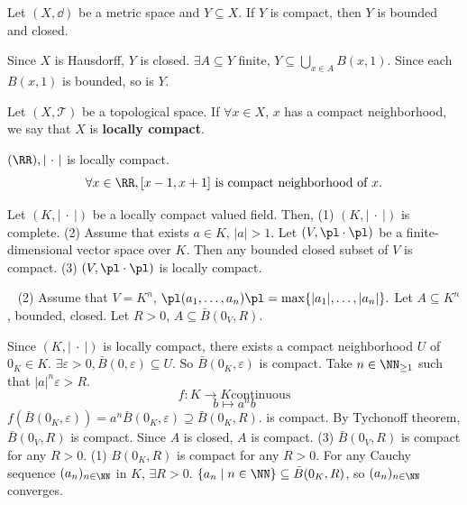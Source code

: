\begin{propositionenv}
    Let $(X,\dd)$ be a metric space and $Y\subseteq X$. If $Y$ is compact, then $Y$ is bounded and closed.
\end{propositionenv}
\begin{proofenv}
    Since $X$ is Hausdorff, $Y$ is closed. $\exists A\subseteq Y$ finite, $Y\subseteq \bigcup_{x\in A}B(x,1)$. Since each $B(x,1)$ is bounded, so is $Y$.
\end{proofenv}
\begin{definitionenv}
    Let $(X,\mathscr{T})$ be a topological space. If $\forall x\in X$, $x$ has a compact neighborhood, we say that $X$ is \textbf{locally compact}.
\end{definitionenv}
\begin{exampleenv}
    $(\RR),\left|\ \cdot\ \right|$ is locally compact. 
    $$\forall x\in \RR, [x-1,x+1] \text{ is compact neighborhood of } x.$$
\end{exampleenv}
\begin{propositionenv}
    Let $(K,\left|\ \cdot\ \right|)$ be a locally compact valued field. Then,
    \newline
    (1) $(K,\left|\ \cdot\ \right|)$ is complete.
    \newline
    (2) Assume that exists $a\in K$, $|a|>1$. Let $(V,\pl\cdot\pl)$ be a finite-dimensional vector space over $K$. Then any bounded closed subset of $V$ is compact.
    \newline
    (3) $(V,\pl\cdot\pl)$  is locally compact.
\end{propositionenv}
\begin{proofenv}
    \ \newline
    (2) Assume that $V=K^n$, $\pl(a_1,\ldots,a_n)\pl=\max\{|a_1|,\ldots,|a_n|\}.$ Let $A\subseteq K^n$, bounded, closed. Let $R>0$, $A\subseteq \bar{B}(0_V,R)$. 

    \quad Since $(K,\left|\ \cdot\ \right|)$ is locally compact, there exists a compact neighborhood $U$ of $0_K\in K$. $\exists\varepsilon>0, \bar{B}(0,\varepsilon)\subseteq U$. So $\bar{B}(0_K,\varepsilon)$ is compact. Take $n\in \NN_{\ge 1}$ such that $|a|^n\varepsilon> R$.
    $$f:K\longrightarrow K \text{continuous}$$
    $$b\longmapsto a^n b$$
    $f\left(\bar{B}(0_K,\varepsilon)\right)=a^n\bar{B}(0_K,\varepsilon)\supseteq \bar{B}(0_K,R).$ is compact. By Tychonoff theorem, $\bar{B}(0_V,R)$ is compact. Since $A$ is closed, $A$ is compact.
    \newline
    (3) $\bar{B}(0_V,R)$ is compact for any $R>0$.
    \newline
    (1) $B(0_K,R)$ is compact for any $R>0$. For any Cauchy sequence $(a_n)_{n\in \NN}$ in $K$, $\exists R>0$. $\{a_n\mid n\in \NN\}\subseteq \bar{B}(0_K,R)$, so $(a_n)_{n\in \NN}$ converges.
\end{proofenv}
